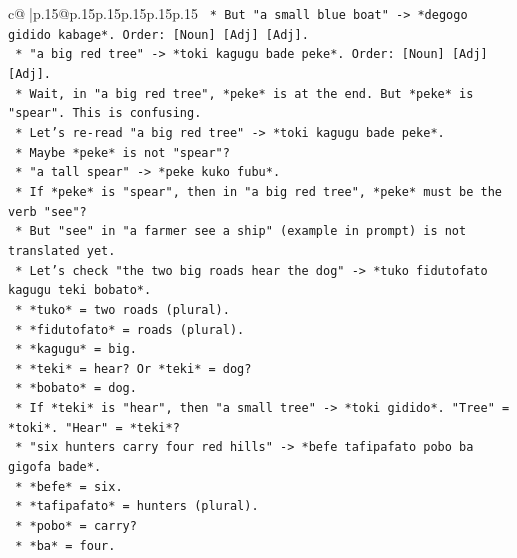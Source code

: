 \documentclass{article}
\begin{document}
{\begin{supertabular}{c@{$\;$}|p{.15\linewidth}@{}p{.15\linewidth}p{.15\linewidth}p{.15\linewidth}p{.15\linewidth}p{.15\linewidth}}
{{{\texttt{                    *   But "a small blue boat" {-}> *degogo gidido kabage*. Order: {[}Noun{]} {[}Adj{]} {[}Adj{]}.} \\
\texttt{                    *   "a big red tree" {-}> *toki kagugu bade peke*. Order: {[}Noun{]} {[}Adj{]} {[}Adj{]}.} \\
\texttt{                    *   Wait, in "a big red tree", *peke* is at the end. But *peke* is "spear". This is confusing.} \\
\texttt{                    *   Let's re{-}read "a big red tree" {-}> *toki kagugu bade peke*.} \\
\texttt{                        *   Maybe *peke* is not "spear"?} \\
\texttt{                        *   "a tall spear" {-}> *peke kuko fubu*.} \\
\texttt{                        *   If *peke* is "spear", then in "a big red tree", *peke* must be the verb "see"?} \\
\texttt{                        *   But "see" in "a farmer see a ship" (example in prompt) is not translated yet.} \\
\texttt{                        *   Let's check "the two big roads hear the dog" {-}> *tuko fidutofato kagugu teki bobato*.} \\
\texttt{                            *   *tuko* = two roads (plural).} \\
\texttt{                            *   *fidutofato* = roads (plural).} \\
\texttt{                            *   *kagugu* = big.} \\
\texttt{                            *   *teki* = hear? Or *teki* = dog?} \\
\texttt{                            *   *bobato* = dog.} \\
\texttt{                            *   If *teki* is "hear", then "a small tree" {-}> *toki gidido*. "Tree" = *toki*. "Hear" = *teki*?} \\
\texttt{                            *   "six hunters carry four red hills" {-}> *befe tafipafato pobo ba gigofa bade*.} \\
\texttt{                                *   *befe* = six.} \\
\texttt{                                *   *tafipafato* = hunters (plural).} \\
\texttt{                                *   *pobo* = carry?} \\
\texttt{                                *   *ba* = four.} \\
}}}
\end{supertabular}}
\end{document}
